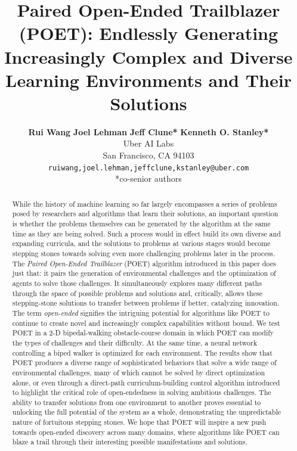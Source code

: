 \documentclass{article}
\title{
Paired Open-Ended Trailblazer (POET): Endlessly Generating Increasingly Complex and Diverse Learning Environments and Their Solutions}
\author{
\textbf{Rui Wang} \hspace{5mm} \textbf{Joel Lehman} \hspace{5mm}  \textbf{Jeff Clune*}  \hspace{5mm}  \textbf{Kenneth O. Stanley*}\\
  Uber AI Labs\\
  San Francisco, CA 94103 \\
  \texttt{{ruiwang,joel.lehman,jeffclune,kstanley}@uber.com} \\
  *co-senior authors
}
\begin{document}
\maketitle
\begin{abstract}
While the history of machine learning so far largely
encompasses a series of problems posed by researchers and algorithms that learn their solutions, an important question is whether the problems themselves can be generated by the algorithm at the same time as they are being solved.  Such a process would in effect build its own diverse and expanding curricula, and the solutions to problems at various stages would become stepping stones towards solving even more challenging problems later in the process.  The \emph{Paired Open-Ended Trailblazer} (POET) algorithm introduced in this paper does just that: it pairs the generation of environmental challenges and the optimization of agents to solve those challenges.  It simultaneously explores many different paths through the space of possible problems and solutions and, critically, allows these stepping-stone solutions to transfer between problems if better, catalyzing innovation. The term \emph{open-ended} signifies the intriguing potential for algorithms like POET to continue to create novel and increasingly complex capabilities without bound.  We test POET in a 2-D bipedal-walking obstacle-course domain in which POET can modify the types of challenges and their difficulty. At the same time, a neural network controlling a biped walker is optimized for each environment.  The results show that POET produces a diverse range of sophisticated behaviors that solve a wide range of environmental challenges, many of which cannot be solved by direct optimization alone, or even through a direct-path curriculum-building control algorithm introduced to highlight the critical role of open-endedness in solving ambitious challenges.  The ability to transfer solutions from one environment to another proves essential to unlocking the full potential of the system as a whole, demonstrating the unpredictable nature of fortuitous stepping stones.  We hope that POET will inspire a new push towards open-ended discovery across many domains, where algorithms like POET can blaze a trail through their interesting possible manifestations and solutions.

\end{abstract}
\end{document}
